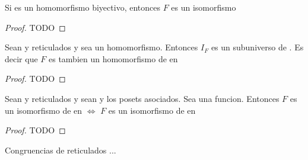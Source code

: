 \begin{lemma}
  Si  es un homomorfismo biyectivo,
  entonces $F$ es un isomorfismo
\end{lemma}
\begin{proof}
  TODO
\end{proof}
\begin{lemma}
  Sean \reticulAlg y  reticulados y sea 
  un homomorfismo. Entonces $I_F$ es un subuniverso de . Es decir que $F$
  es tambien un homomorfismo de \reticulAlg en 
\end{lemma}
\begin{proof}
  TODO
\end{proof}
\begin{lemma}
  Sean \reticulAlg y  reticulados y sean  y 
  los posets asociados. Sea  una funcion. Entonces $F$ es un isomorfismo de
  \reticulAlg en  $\iff$ $F$ es un isomorfismo de  en 
\end{lemma}
\begin{proof}
  TODO
\end{proof}
\begin{definition}
  Congruencias de reticulados ...
\end{definition}

